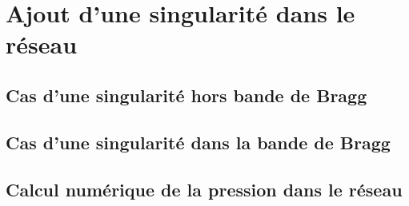 \chapter{Ajout d'une singularité dans le réseau}
\section{Cas d'une singularité hors bande de Bragg}
\section{Cas d'une singularité dans la bande de Bragg}
\section{Calcul numérique de la pression dans le réseau}
